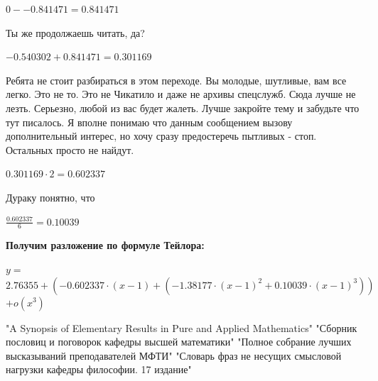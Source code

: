 \documentclass[12pt,a4paper,fleqn]{article}
\begin{document}
\begin{center}
\end{center}
\begin{center}$0--0.841471 = 0.841471$\end{center}
Ты же продолжаешь читать, да?

\begin{center}
\end{center}
\begin{center}$-0.540302+0.841471 = 0.301169$\end{center}
Ребята не стоит разбираться в этом переходе. Вы молодые, шутливые, вам все легко. Это не то. Это не Чикатило и даже не архивы спецслужб. Сюда лучше не лезть. Серьезно, любой из вас будет жалеть. Лучше закройте тему и забудьте что тут писалось. Я вполне понимаю что данным сообщением вызову дополнительный интерес, но хочу сразу предостеречь пытливых - стоп. Остальных просто не найдут.

\begin{center}
\end{center}
\begin{center}$0.301169 \cdot 2 = 0.602337$\end{center}
Дураку понятно, что

\begin{center}
\end{center}
\begin{center}$\frac{0.602337}{6} = 0.10039$\end{center}
\textbf{\LARGE{Получим разложение по формуле Тейлора:}}
\begin{center}
$y = $$2.76355+(-0.602337 \cdot (x-1)+(-1.38177 \cdot (x-1)^{2}+0.10039 \cdot (x-1)^{3}))$$ + o(x^{3})$
\end{center}
\newpage\begin{thebibliography}{}
  "A Synopsis of Elementary Results in Pure and Applied Mathematics"
  "Сборник пословиц и поговорок кафедры высшей математики"
  "Полное собрание лучших высказываний преподавателей МФТИ"
  "Словарь фраз не несущих смысловой нагрузки кафедры философии. 17 издание"
\end{thebibliography}
\end{document}
